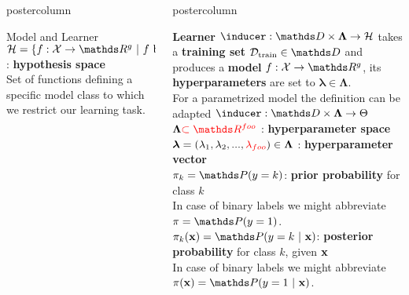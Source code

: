 \documentclass{beamer}
\newlength{\columnheight} %
\begin{document}
\begin{frame}[fragile]{}
\begin{columns}
\begin{column}{.31\textwidth}
\begin{beamercolorbox}[center]{postercolumn}
\begin{minipage}{.98\textwidth}
{\begin{myblock}{Model and Learner}
            $\Hspace = \{f : \Xspace \rightarrow \R^g ~|~ f \text{ belongs to a certain functional family}\}$ : \textbf{hypothesis space} \\
              \hspace*{1ex}Set of functions defining a specific model class to which we restrict our learning task. 					
					\end{myblock}\vfill
				}
			\end{minipage}
		\end{beamercolorbox}
	\end{column}
	\begin{column}{.31\textwidth}
		\begin{beamercolorbox}[center]{postercolumn}
			\begin{minipage}{.98\textwidth}
				\parbox[t][\columnheight]{\textwidth}{
					\begin{myblock}{} \vspace{-4ex}
						 \textbf{Learner }$\inducer: \preimageInducerShort \rightarrow \Hspace$  takes a \textbf{training set}  $\Dtrain \in \allDatasets$  and produces a \textbf{model} $f : \Xspace \rightarrow \R^g$, its \textbf{hyperparameters} are set to $\bm{\lambda} \in \bm{\Lambda}$.\\
            \hspace*{1ex}For a parametrized model the definition can be adapted $\inducer: \preimageInducerShort \rightarrow \Theta$ \\
            
              $\bm{\Lambda} \textcolor{red}{\subset \R^{foo}}$ : \textbf{hyperparameter space} \\
            
              $\bm{\lambda} = (\lambda_1, \lambda_2, ..., \textcolor{red}{\lambda_{foo}}) \in \bm{\Lambda}$ : \textbf{hyperparameter vector} \\
              
              $\pi_k = \P(y = k)$:\textbf{ prior probability} for class $k$ \\
                \hspace*{1ex}In case of binary labels we might abbreviate $\pi = \P(y = 1)$. \\
             
              $\pikx = \postk$: \textbf{posterior probability} for class $k$, given $\mathbf{x}$ \\
                \hspace*{1ex}In case of binary labels we might abbreviate $\pix = \post$. \\
              

\end{myblock}}
\end{minipage}
\end{beamercolorbox}
\end{column}
\end{columns}
\end{frame}
\end{document}
